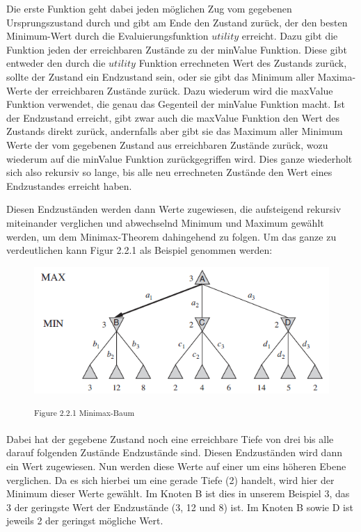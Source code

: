 Die erste Funktion geht dabei jeden möglichen Zug vom gegebenen Ursprungszustand durch und gibt am Ende den Zustand zurück, der den besten Minimum-Wert durch die Evaluierungsfunktion $utility$ erreicht. Dazu gibt die Funktion jeden der erreichbaren Zustände zu der minValue Funktion. Diese gibt entweder den durch die $utility$ Funktion errechneten Wert des Zustands zurück, sollte der Zustand ein Endzustand sein, oder sie gibt das Minimum aller Maxima-Werte der erreichbaren Zustände zurück. Dazu wiederum wird die maxValue Funktion verwendet, die genau das Gegenteil der minValue Funktion macht. Ist der Endzustand erreicht, gibt zwar auch die maxValue Funktion den Wert des Zustands direkt zurück, andernfalls aber gibt sie das Maximum aller Minimum Werte der vom gegebenen Zustand aus erreichbaren Zustände zurück, wozu wiederum auf die minValue Funktion zurückgegriffen wird. Dies ganze wiederholt sich also rekursiv so lange, bis alle neu errechneten Zustände den Wert eines Endzustandes erreicht haben.

Diesen Endzuständen werden dann Werte zugewiesen, die aufsteigend rekursiv miteinander verglichen und abwechselnd Minimum und Maximum gewählt werden, um dem Minimax-Theorem dahingehend zu folgen. Um das ganze zu verdeutlichen kann Figur 2.2.1 als Beispiel genommen werden:

\begin{figure}[h]
\centering
\includegraphics[width=\textwidth/5*4]{images/minimax_algorithm_tree.png}

\textsuperscript{Figure 2.2.1 Minimax-Baum \cite{}}\\
\end{figure}

Dabei hat der gegebene Zustand noch eine erreichbare Tiefe von drei bis alle darauf folgenden Zustände Endzustände sind. Diesen Endzuständen wird dann ein Wert zugewiesen. Nun werden diese Werte auf einer um eins höheren Ebene verglichen. Da es sich hierbei um eine gerade Tiefe (2) handelt, wird hier der Minimum dieser Werte gewählt. Im Knoten B ist dies in unserem Beispiel 3, das 3 der geringste Wert der Endzustände (3, 12 und 8) ist. Im Knoten B sowie D ist jeweils 2 der geringst mögliche Wert. 

